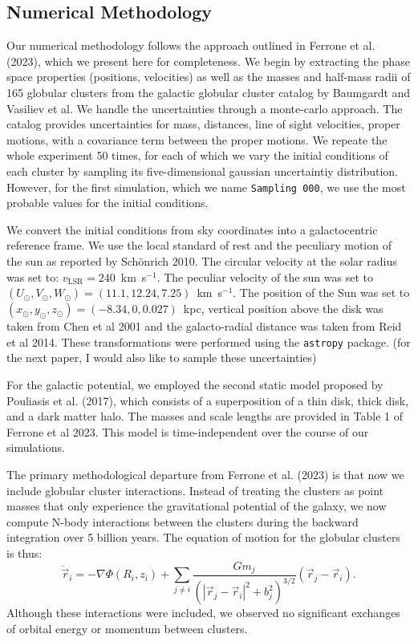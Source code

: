 \documentclass[draft]{aa}
\begin{document}
  \subsection{Numerical Methodology}
    Our numerical methodology follows the approach outlined in Ferrone et al. (2023), which we present here for completeness. We begin by extracting the phase space properties (positions, velocities) as well as the masses and half-mass radii of 165 globular clusters from the galactic globular cluster catalog by Baumgardt and Vasiliev et al. We handle the uncertainties through a monte-carlo approach. The catalog provides uncertainties for mass, distances, line of sight velocities, proper motions, with a covariance term between the proper motions. We repeate the whole experiment 50 times, for each of which we vary the initial conditions of each cluster by sampling its five-dimensional gaussian uncertaintiy distribution. However, for the first simulation, which we name \texttt{Sampling 000}, we use the most probable values for the initial conditions. 

    We convert the initial conditions from sky coordinates into a galactocentric reference frame. We use the local standard of rest and the peculiary motion of the sun as reported by Sch\"onrich 2010. The circular velocity at the solar radius was set to: $v_{\text{LSR}} = 240$~km~s$^{-1}$. The peculiar velocity of the sun was set to $(U_\odot, V_\odot, W_\odot)=(11.1, 12.24, 7.25)$~km~s$^{-1}$. The position of the Sun was set to $(x_\odot,y_\odot,z_\odot) = (-8.34,0,0.027)$~kpc, vertical position above the disk was taken from Chen et al 2001 and the galacto-radial distance was taken from Reid et al 2014. These transformations were performed using the \texttt{astropy} package. (for the next paper, I would also like to sample these uncertainties)

    For the galactic potential, we employed the second static model proposed by Pouliasis et al. (2017), which consists of a superposition of a thin disk, thick disk, and a dark matter halo. The masses and scale lengths are provided in Table 1 of Ferrone et al 2023. This model is time-independent over the course of our simulations. 

    The primary methodological departure from Ferrone et al. (2023) is that now we include globular cluster interactions. Instead of treating the clusters as point masses that only experience the gravitational potential of the galaxy, we now compute N-body interactions between the clusters during the backward integration over 5 billion years. The equation of motion for the globular clusters is thus: 
    \begin{equation}
      \ddot{\vec{r}}_i = -\nabla \Phi(R_i,z_i) + \left.\sum_{j\neq i} \frac{Gm_j}{\left(|\vec{r}_j - \vec{r}_i|^2 + b_j^2\right)^{3/2}}\right. \left(\vec{r}_j - \vec{r}_i\right).
      \end{equation}\label{eq:GCNBody}
    Although these interactions were included, we observed no significant exchanges of orbital energy or momentum between clusters. 
\end{document}
